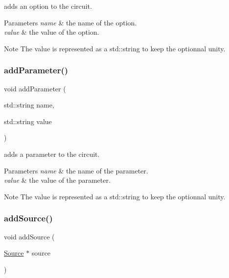 adds an option to the circuit. 


\begin{DoxyParams}{Parameters}
{\em name} & the name of the option. \\
\hline
{\em value} & the value of the option.\\
\hline
\end{DoxyParams}
\begin{DoxyNote}{Note}
The value is represented as a std\+::string to keep the optionnal unity. 
\end{DoxyNote}
\mbox{\label{class_s_p_i_c_e_1_1_circuit_ab3ab147a16bc490ce96db905a4ca271c}} 
\subsubsection{\texorpdfstring{add\+Parameter()}{addParameter()}}
{\footnotesize\ttfamily void add\+Parameter (\begin{DoxyParamCaption}\item[{std\+::string}]{name,  }\item[{std\+::string}]{value }\end{DoxyParamCaption})}



adds a parameter to the circuit. 


\begin{DoxyParams}{Parameters}
{\em name} & the name of the parameter. \\
\hline
{\em value} & the value of the parameter.\\
\hline
\end{DoxyParams}
\begin{DoxyNote}{Note}
The value is represented as a std\+::string to keep the optionnal unity. 
\end{DoxyNote}
\mbox{\label{class_s_p_i_c_e_1_1_circuit_a627cf18c2763bb59f3d7e5142873251c}} 
\subsubsection{\texorpdfstring{add\+Source()}{addSource()}}
{\footnotesize\ttfamily void add\+Source (\begin{DoxyParamCaption}\item[{\hyperlink{class_s_p_i_c_e_1_1_source}{Source} $\ast$}]{source }\end{DoxyParamCaption})\hspace{0.3cm}{\ttfamily [inline]}}



